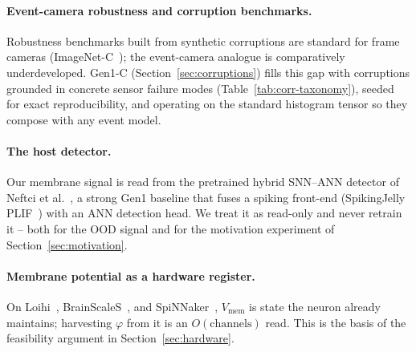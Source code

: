 \paragraph{Event-camera robustness and corruption benchmarks.}
Robustness benchmarks built from synthetic corruptions are standard for frame cameras
(ImageNet-C~\cite{hendrycks2019imagenetc}); the event-camera analogue is comparatively
underdeveloped. Gen1-C (Section~\ref{sec:corruptions}) fills this gap with corruptions
grounded in concrete sensor failure modes (Table~\ref{tab:corr-taxonomy}), seeded for exact
reproducibility, and operating on the standard histogram tensor so they compose with any
event model.

\paragraph{The host detector.}
Our membrane signal is read from the pretrained hybrid SNN--ANN detector of
Neftci et al.~\cite{neftci2025hybrid}, a strong Gen1 baseline that fuses a spiking front-end (SpikingJelly
PLIF~\cite{fang2021plif}) with an ANN detection head. We treat it as read-only and never
retrain it -- both for the OOD signal and for the motivation experiment of
Section~\ref{sec:motivation}.

\paragraph{Membrane potential as a hardware register.}
On Loihi~\cite{davies2018loihi}, BrainScaleS~\cite{schemmel2010brainscales}, and
SpiNNaker~\cite{furber2014spinnaker}, $V_{\mathrm{mem}}$ is state the neuron already
maintains; harvesting $\varphi$ from it is an $O(\text{channels})$ read. This is the basis of
the feasibility argument in Section~\ref{sec:hardware}.
